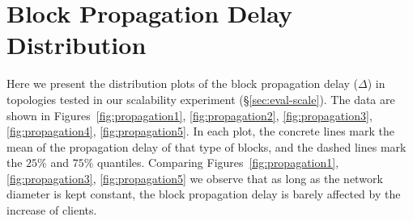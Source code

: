\chapter{Block Propagation Delay Distribution}
\label{apx:propagation}

 Here we present the distribution plots of the block propagation delay ($\Delta$) in topologies tested in our scalability experiment (\S\ref{sec:eval-scale}). The data are shown in Figures~\ref{fig:propagation1}, \ref{fig:propagation2}, \ref{fig:propagation3}, \ref{fig:propagation4}, \ref{fig:propagation5}. In each plot, the concrete lines mark the mean of the propagation delay of that type of blocks, and the dashed lines mark the $25\%$ and $75\%$ quantiles. Comparing Figures~\ref{fig:propagation1}, \ref{fig:propagation3}, \ref{fig:propagation5} we observe that as long as the network diameter is kept constant, the block propagation delay is barely affected by the increase of clients.


